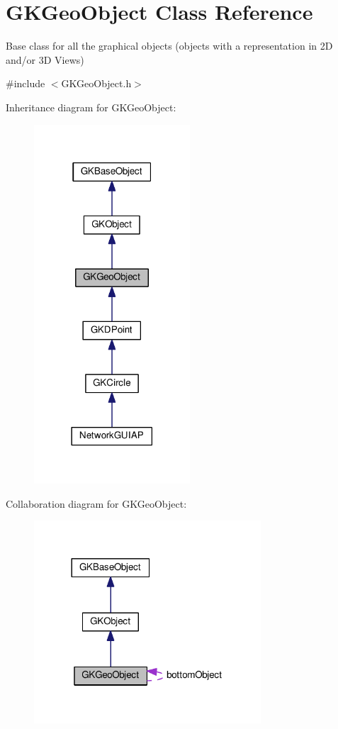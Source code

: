 \hypertarget{classGKGeoObject}{}\section{G\+K\+Geo\+Object Class Reference}
\label{classGKGeoObject}


Base class for all the graphical objects (objects with a representation in 2D and/or 3D Views)  




{\ttfamily \#include $<$G\+K\+Geo\+Object.\+h$>$}



Inheritance diagram for G\+K\+Geo\+Object\+:
\nopagebreak
\begin{figure}[H]
\begin{center}
\leavevmode
\includegraphics[width=165pt]{classGKGeoObject__inherit__graph}
\end{center}
\end{figure}


Collaboration diagram for G\+K\+Geo\+Object\+:
\nopagebreak
\begin{figure}[H]
\begin{center}
\leavevmode
\includegraphics[width=240pt]{classGKGeoObject__coll__graph}
\end{center}
\end{figure}

